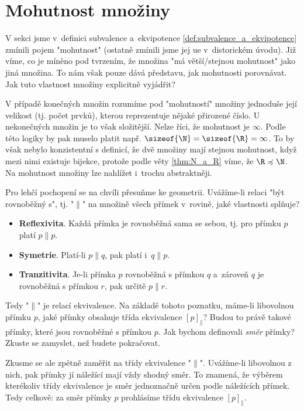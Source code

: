 \section{Mohutnost množiny}\label{sec:mohutnost_mnoziny}
V sekci jsme v~definici subvalence a~ekvipotence \ref{def:subvalence_a_ekvipotence} zmínili pojem "mohutnost" (ostatně zmínili jsme jej ue v~distorickém úvodu). Již víme, co je míněno pod tvrzením, že množina "má větší/stejnou mohutnost" jako jiná množina. To nám však pouze dává představu, jak mohutnosti porovnávat. Jak tuto vlastnost množiny explicitně vyjádřit?\par
V případě konečných množin rozumíme pod "mohutností" množiny jednoduše její velikost (tj. počet prvků), kterou reprezentuje nějaké přirozené číslo. U nekonečných množin je to však složitější. Nelze říci, že mohutnost je $\infty$. Podle této logiky by pak muselo platit např. $\sizeof{\N}=\sizeof{\R}=\infty$. To by však nebylo konzistentní s definicí, že dvě množiny mají stejnou mohutnost, když mezi nimi existuje bijekce, protože podle věty \ref{thm:N_a_R} víme, že $\R\preccurlyeq\N$. Na mohutnost množiny lze nahlížet i~trochu abstraktněji.
\medskip

Pro lehčí pochopení se na chvíli přesuňme ke geometrii. Uvážíme-li relaci "být rovnoběžný s", tj. "$\parallel$" na množině všech přímek v~rovině, jaké vlastnosti splňuje?
\begin{itemize}
    \item \textbf{Reflexivita}. Každá přímka je rovnoběžná sama se sebou, tj. pro přímku $p$ platí $p\parallel p$.
    \item \textbf{Symetrie}. Platí-li $p\parallel q$, pak platí i~$q\parallel p$.
    \item \textbf{Tranzitivita}. Je-li přímka $p$ rovnoběžná s přímkou $q$ a~zároveň $q$ je rovnoběžná s přímkou $r$, pak určitě $p\parallel r$.
\end{itemize}
Tedy "$\parallel$" je relací ekvivalence. Na základě tohoto poznatku, máme-li libovolnou přímku $p$, jaké přímky obsahuje třída ekvivalence $[p]_\parallel$? Budou to právě takové přímky, které jsou rovnoběžné s přímkou $p$. Jak bychom definovali \emph{směr} přímky? Zkuste se zamyslet, než budete pokračovat.\par
Zkusme se ale zpětně zaměřit na třídy ekvivalence "$\parallel$". Uvážíme-li libovolnou z nich, pak přímky jí náležící mají vždy shodný směr. To znamená, že výběrem kterékoliv třídy ekvivalence je směr jednoznačně určen podle náležících přímek. Tedy celkově: za směr přímky $p$ prohlásíme třídu ekvivalence $[p]_\parallel$.
\medskip


